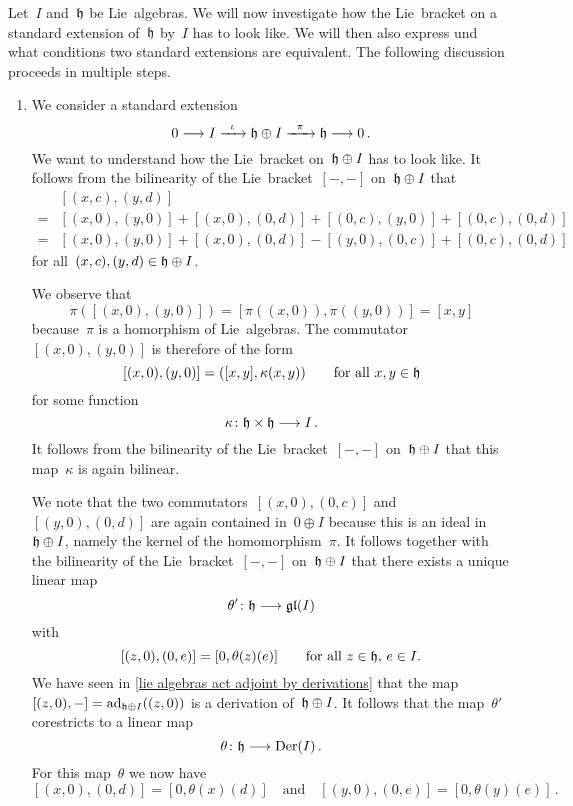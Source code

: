 \begin{fluff}
  \label{general approach to extensions}
  Let~$I$ and~$\mathfrak{h}$ be Lie~algebras.
  We will now investigate how the Lie~bracket on a standard extension of~$\mathfrak{h}$ by~$I$ has to look like.
  We will then also express und what conditions two standard extensions are equivalent.
  The following discussion proceeds in multiple steps.
  \begin{enumerate}
    \item
      We consider a standard extension
      \[
        0
        \to
        I
        \xto{\iota}
        \hlie \oplus I
        \xto{\pi}
        \hlie
        \to
        0 \,.
      \]
      We want to understand how the Lie~bracket on~$\mathfrak{h} \oplus I$ has to look like.
      It follows from the bilinearity of the Lie~bracket~$[-,-]$ on~$\mathfrak{h} \oplus I$ that
      \begin{align*}
        {}&
        [(x, c), (y,d)]
        \\
        ={}&
          [(x,0), (y,0)]
        + [(x,0), (0,d)]
        + [(0,c), (y,0)]
        + [(0,c), (0,d)]
        \\
        ={}&
          [(x,0), (y,0)]
        + [(x,0), (0,d)]
        - [(y,0), (0,c)]
        + [(0,c), (0,d)]
      \end{align*}
      for all~$(x,c), (y,d) \in \mathfrak{h} \oplus I$.

      We observe that
      \[
        \pi( [(x,0), (y,0)] )
        =
        [ \pi( (x,0) ), \pi( (y,0) ) ]
        =
        [x, y]
      \]
      because~$\pi$ is a homorphism of Lie~algebras.
      The commutator~$[(x,0), (y,0)]$ is therefore of the form
      \[
        [(x,0), (y,0)]
        =
        ( [x,y], \kappa(x,y) )
        \qquad
        \text{for all~$x, y \in \mathfrak{h}$}
      \]
      for some function
      \[
        \kappa
        \colon
        \hlie \times \hlie
        \to
        I \,.
      \]
      It follows from the bilinearity of the Lie~bracket~$[-,-]$ on~$\mathfrak{h} \oplus I$ that this map~$\kappa$ is again bilinear.

      We note that the two commutators~$[(x,0), (0,c)]$ and~$[(y,0), (0,d)]$ are again contained in~$0 \oplus I$ because this is an ideal in~$\mathfrak{h} \oplus I$, namely the kernel of the homomorphism~$\pi$.
      It follows together with the bilinearity of the Lie~bracket~$[-,-]$ on~$\mathfrak{h} \oplus I$ that there exists a unique linear map
      \[
        \theta'
        \colon
        \hlie
        \to
        \gllie(I)
      \]
      with
      \[
        [(z,0), (0,e)]
        =
        [0, \theta(z)(e)]
        \qquad
        \text{for all~$z \in \mathfrak{h}$,~$e \in I$.}
      \]
      We have seen in \cref{lie algebras act adjoint by derivations} that the map~$[(z,0), -] = \operatorname{ad}_{\mathfrak{h} \oplus I}((z,0))$ is a derivation of~$\mathfrak{h} \oplus I$.
      It follows that the map~$\theta'$ corestricts to a linear map
      \[
        \theta
        \colon
        \hlie
        \to
        \Der(I) \,.
      \]
      For this map~$\theta$ we now have
      \[
        [(x,0), (0,d)]
        =
        [0, \theta(x)(d)]
        \quad\text{and}\quad
        [(y,0), (0,e)]
        =
        [0, \theta(y)(e)] \,.
      \]


\end{enumerate}
\end{fluff}
